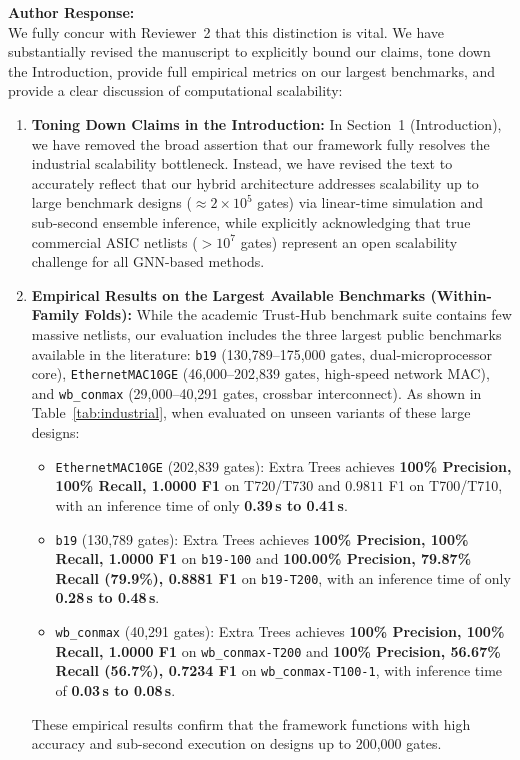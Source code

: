 \documentclass[11pt,a4paper]{article}
\newcommand{\authorresponse}{\noindent\textbf{Author Response:}}
\begin{document}
\authorresponse\\
We fully concur with Reviewer~2 that this distinction is vital. We have substantially revised the manuscript to explicitly bound our claims, tone down the Introduction, provide full empirical metrics on our largest benchmarks, and provide a clear discussion of computational scalability:

\begin{enumerate}[leftmargin=*]
    \item \textbf{Toning Down Claims in the Introduction:} In Section~1 (Introduction), we have removed the broad assertion that our framework fully resolves the industrial scalability bottleneck. Instead, we have revised the text to accurately reflect that our hybrid architecture addresses scalability up to large benchmark designs ($\approx 2 \times 10^5$ gates) via linear-time simulation and sub-second ensemble inference, while explicitly acknowledging that true commercial ASIC netlists ($> 10^7$ gates) represent an open scalability challenge for all GNN-based methods.

    \item \textbf{Empirical Results on the Largest Available Benchmarks (Within-Family Folds):} While the academic Trust-Hub benchmark suite contains few massive netlists, our evaluation includes the three largest public benchmarks available in the literature: \texttt{b19} (130,789--175,000 gates, dual-microprocessor core), \texttt{EthernetMAC10GE} (46,000--202,839 gates, high-speed network MAC), and \texttt{wb\_conmax} (29,000--40,291 gates, crossbar interconnect). As shown in Table~\ref{tab:industrial}, when evaluated on unseen variants of these large designs:
    \begin{itemize}
        \item \texttt{EthernetMAC10GE} (202,839 gates): Extra Trees achieves \textbf{100\% Precision, 100\% Recall, 1.0000 F1} on T720/T730 and $0.9811$ F1 on T700/T710, with an inference time of only \textbf{0.39\,s to 0.41\,s}.
        \item \texttt{b19} (130,789 gates): Extra Trees achieves \textbf{100\% Precision, 100\% Recall, 1.0000 F1} on \texttt{b19-100} and \textbf{100.00\% Precision, 79.87\% Recall (79.9\%), 0.8881 F1} on \texttt{b19-T200}, with an inference time of only \textbf{0.28\,s to 0.48\,s}.
        \item \texttt{wb\_conmax} (40,291 gates): Extra Trees achieves \textbf{100\% Precision, 100\% Recall, 1.0000 F1} on \texttt{wb\_conmax-T200} and \textbf{100\% Precision, 56.67\% Recall (56.7\%), 0.7234 F1} on \texttt{wb\_conmax-T100-1}, with inference time of \textbf{0.03\,s to 0.08\,s}.
    \end{itemize}
    These empirical results confirm that the framework functions with high accuracy and sub-second execution on designs up to 200,000 gates.


\end{enumerate}
\end{document}
